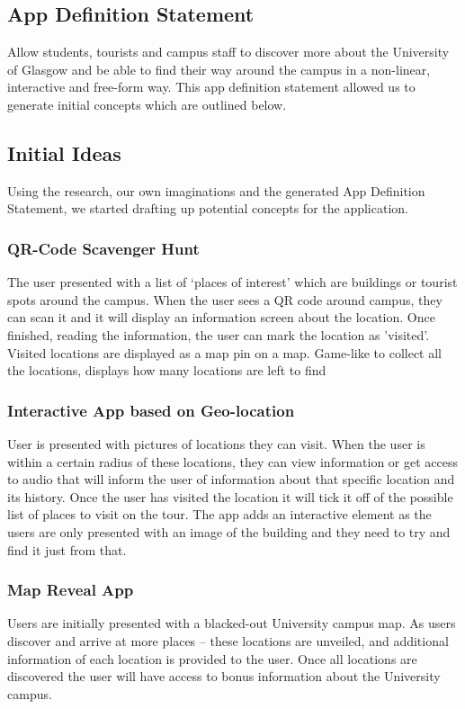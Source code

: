 \documentclass[a4,10pt,twocolumn]{article}
\begin{document}
\subsection{App Definition Statement}
Allow students, tourists and campus staff to discover more about the University of Glasgow and be able to find their way around the campus in a non-linear, interactive and free-form way. 
\newline
\newline
This app definition statement allowed us to generate initial concepts which are outlined below.

\subsection{Initial Ideas}
Using the research, our own imaginations and the generated App Definition Statement, we started drafting up potential concepts for the application. 

\subsubsection{QR-Code Scavenger Hunt}
The user presented with a list of ‘places of interest’ which are buildings or tourist spots around the campus. When the user sees a QR code around campus, they can scan it and it will display an information screen about the location. Once finished, reading the information, the user can mark the location as 'visited'. Visited locations are displayed as a map pin on a map. Game-like to collect all the locations, displays how many locations are left to find 

\subsubsection{Interactive App based on Geo-location}
User is presented with pictures of locations they can visit. When the user is within a certain radius of these locations, they can view information or get access to audio that will inform the user of information about that specific location and its history. Once the user has visited the location it will tick it off of the possible list of places to visit on the tour. The app adds an interactive element as the users are only presented with an image of the building and they need to try and find it just from that.

\subsubsection{Map Reveal App}
Users are initially presented with a blacked-out University campus map. As users discover and arrive at more places – these locations are unveiled, and additional information of each location is provided to the user. Once all locations are discovered the user will have access to bonus information about the University campus. 
\end{document}
